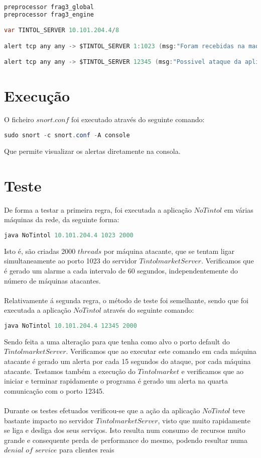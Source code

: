 \documentclass[10pt,a4paper]{report}
\begin{document}
\begin{lstlisting}[language=Java]
preprocessor frag3_global
preprocessor frag3_engine

var TINTOL_SERVER 10.101.204.4/8

alert tcp any any -> $TINTOL_SERVER 1:1023 (msg:"Foram recebidas na maquina 5 ou mais ligacoes TCP para portos inferiores a 1024 num intervalo de um minuto";threshold:type both, track by_dst, count 5, seconds 60;sid:10001)

alert tcp any any -> $TINTOL_SERVER 12345 (msg:"Possivel ataque da aplicacao NoTintol"; threshold: type both, track by_src, count 4, seconds 15; sid:10002;)
\end{lstlisting}

\section*{Execução}
O ficheiro $snort.conf$ foi executado através do seguinte comando:
\begin{lstlisting}[language=Java]
sudo snort -c snort.conf -A console
\end{lstlisting}
Que permite visualizar os alertas diretamente na consola.

\section*{Teste}
De forma a testar a primeira regra, foi executada a aplicação $NoTintol$ em várias máquinas da rede, da seguinte forma:
\begin{lstlisting}[language=Java]
java NoTintol 10.101.204.4 1023 2000
\end{lstlisting}
Isto é, são criadas 2000 $threads$ por máquina atacante, que se tentam ligar simultaneamente ao porto 1023 do servidor $TintolmarketServer$. Verificamos que é gerado um alarme a cada intervalo de 60 segundos, independentemente do número de máquinas atacantes.\\
\\
Relativamente á segunda regra, o método de teste foi semelhante, sendo que foi executada a aplicação $NoTintol$ através do seguinte comando:
\begin{lstlisting}[language=Java]
java NoTintol 10.101.204.4 12345 2000
\end{lstlisting}
Sendo feita a uma alteração para que tenha como alvo o porto default do $TintolmarketServer$. Verificamos que ao executar este comando em cada máquina atacante é gerado um alerta por cada 15 segundos do ataque, por cada máquina atacante. Testamos também a execução do $Tintolmarket$ e verificamos que ao iniciar e terminar rapidamente o programa é gerado um alerta na quarta comunicação com o porto 12345.\\
\\
Durante os testes efetuados verificou-se que a ação da aplicação $NoTintol$ teve bastante impacto no servidor $TintolmarketServer$, visto que muito rapidamente se liga e desliga dos seus serviços. Isto resulta num consumo de recursos muito grande e consequente perda de performance do mesmo, podendo resultar numa $denial$ $of$ $service$ para clientes reais
\end{document}
